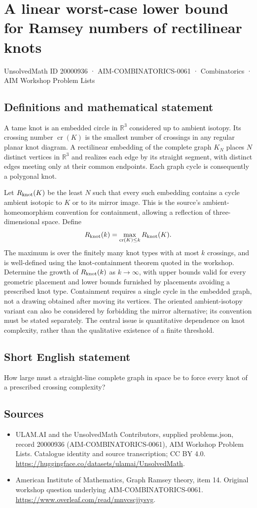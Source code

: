\documentclass[11pt,a4paper]{article}
\begin{document}
\section*{A linear worst-case lower bound for Ramsey numbers of rectilinear knots}\label{20000936}
{\small UnsolvedMath ID 20000936 · AIM-COMBINATORICS-0061 · Combinatorics · AIM Workshop Problem Lists}
\subsection{Definitions and mathematical statement}
A tame knot is an embedded circle in $\mathbb R^3$ considered up to ambient isotopy.
Its crossing number $\operatorname{cr}(K)$ is the smallest number of crossings in any regular planar knot diagram.
A rectilinear embedding of the complete graph $K_N$ places $N$ distinct vertices in $\mathbb R^3$ and realizes each edge by its straight segment, with distinct edges meeting only at their common endpoints.
Each graph cycle is consequently a polygonal knot.

Let $R_{\rm knot}(K)$ be the least $N$ such that every such embedding contains a cycle ambient isotopic to $K$ or to its mirror image.
This is the source's ambient-homeomorphism convention for containment, allowing a reflection of three-dimensional space.
Define
\[
 R_{\rm knot}(k)=\max_{\operatorname{cr}(K)\leq k}R_{\rm knot}(K).
\]
The maximum is over the finitely many knot types with at most $k$ crossings, and is well-defined using the knot-containment theorem quoted in the workshop.
Determine the growth of $R_{\rm knot}(k)$ as $k\to\infty$, with upper bounds valid for every geometric placement and lower bounds furnished by placements avoiding a prescribed knot type.
Containment requires a single cycle in the embedded graph, not a drawing obtained after moving its vertices.
The oriented ambient-isotopy variant can also be considered by forbidding the mirror alternative; its convention must be stated separately.
The central issue is quantitative dependence on knot complexity, rather than the qualitative existence of a finite threshold.
\subsection{Short English statement}
How large must a straight-line complete graph in space be to force every knot of a prescribed crossing complexity?
\subsection{Sources}
\begin{itemize}
\item[S1] ULAM.AI and the UnsolvedMath Contributors, supplied problems.json, record 20000936 (AIM-COMBINATORICS-0061), AIM Workshop Problem Lists. Catalogue identity and source transcription; CC BY 4.0.
\url{https://huggingface.co/datasets/ulamai/UnsolvedMath}.
\item[S2] American Institute of Mathematics, Graph Ramsey theory, item 14. Original workshop question underlying AIM-COMBINATORICS-0061.
\url{https://www.overleaf.com/read/mnvcscjjysvg}.
\end{itemize}
\end{document}
